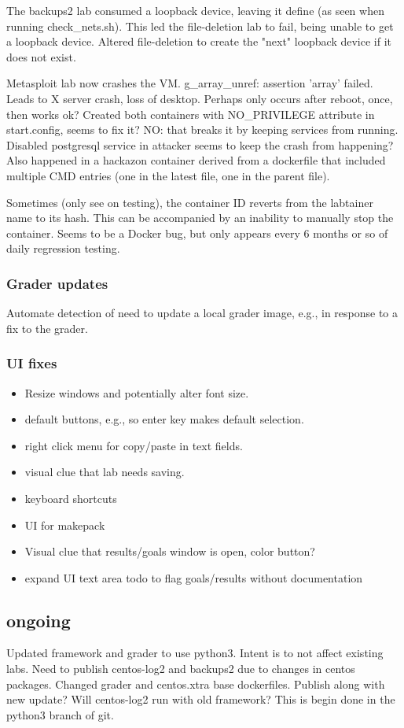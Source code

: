 \documentclass[12pt]{article}
\begin{document}
The backups2 lab consumed a loopback device, leaving it define (as seen when running check\_nets.sh).  This
led the file-deletion lab to fail, being unable to get a loopback device.  Altered file-deletion to create the
"next" loopback device if it does not exist.

Metasploit lab now crashes the VM.  g\_array\_unref: assertion 'array' failed.   Leads to X server crash, loss of
desktop.  Perhaps only occurs after reboot, once, then works ok?  Created both containers with NO\_PRIVILEGE attribute
in start.config, seems to fix it?  NO: that breaks it by keeping services from running.  Disabled postgresql service
in attacker seems to keep the crash from happening?  Also happened in a hackazon container derived from a dockerfile that
included multiple CMD entries (one in the latest file, one in the parent file).

Sometimes (only see on testing), the container ID reverts from the labtainer name to its hash.  This can be accompanied by an
inability to manually stop the container. Seems to be a Docker bug, but only appears every 6 months or so of daily regression testing.

\subsubsection{Grader updates}
Automate detection of need to update a local grader image, e.g., in response to a fix to the grader.

\subsubsection{UI fixes}
\begin{itemize}
\item Resize windows and potentially alter font size.
\item default buttons, e.g., so enter key makes default selection.
\item right click menu for copy/paste in text fields.
\item visual clue that lab needs saving.
\item keyboard shortcuts
\item UI for makepack
\item Visual clue that results/goals window is open, color button?
\item expand UI text area todo to flag goals/results without documentation
\end{itemize}

\subsection{ongoing}
Updated framework and grader to use python3.  Intent is to not affect existing labs.  Need to publish centos-log2 and
backups2 due to changes in centos packages.  Changed grader and centos.xtra base dockerfiles.
Publish along with new update?   Will centos-log2 run with old framework?
This is begin done in the python3 branch of git.
\end{document}
